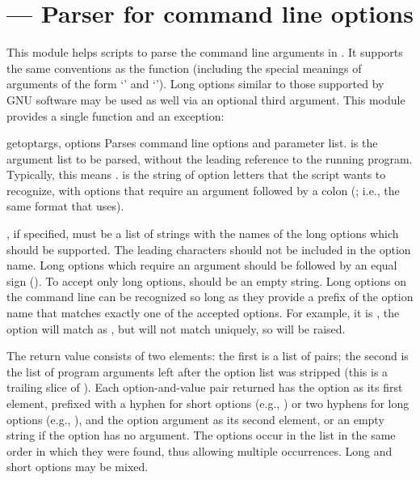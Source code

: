 \section{ ---
         Parser for command line options}



This module helps scripts to parse the command line arguments in
.
It supports the same conventions as the \UNIX{} 
function (including the special meanings of arguments of the form
`\code{-}' and `\code{-}\code{-}').
Long options similar to those supported by
GNU software may be used as well via an optional third argument.
This module provides a single function and an exception:

\begin{funcdesc}{getopt}{args, options}
Parses command line options and parameter list.   is the
argument list to be parsed, without the leading reference to the
running program. Typically, this means .
 is the string of option letters that the script wants to
recognize, with options that require an argument followed by a colon
(\character{:}; i.e., the same format that \UNIX{}
 uses).


, if specified, must be a list of strings with the
names of the long options which should be supported.  The leading
 characters should not be included in the option
name.  Long options which require an argument should be followed by an
equal sign (\character{=}).  To accept only long options,
 should be an empty string.  Long options on the command
line can be recognized so long as they provide a prefix of the option
name that matches exactly one of the accepted options.  For example,
it  is , the option
 will match as , but
 will not match uniquely, so 
will be raised.

The return value consists of two elements: the first is a list of
 pairs; the second is the list of
program arguments left after the option list was stripped (this is a
trailing slice of ).  Each option-and-value pair returned
has the option as its first element, prefixed with a hyphen for short
options (e.g., ) or two hyphens for long options (e.g.,
), and the option argument as its second
element, or an empty string if the option has no argument.  The
options occur in the list in the same order in which they were found,
thus allowing multiple occurrences.  Long and short options may be
mixed.
\end{funcdesc}

